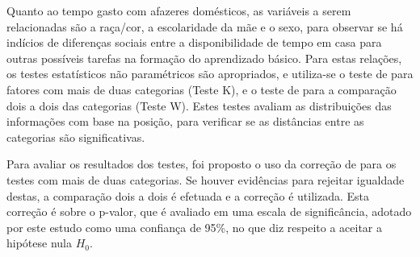 Quanto ao tempo gasto com afazeres domésticos, as variáveis a serem relacionadas são a raça/cor, a escolaridade da mãe
e o sexo, para observar se há indícios de diferenças sociais entre a disponibilidade de tempo em casa para outras possíveis 
tarefas na formação do aprendizado básico. Para estas relações, os testes estatísticos não paramétricos são apropriados,
e utiliza-se o teste de  para fatores com mais de duas categorias (Teste K), e o
teste de  para a comparação dois a dois das categorias (Teste W). Estes testes avaliam as
distribuições das informações com base na posição, para verificar se as distâncias entre as categorias são significativas.

Para avaliar os resultados dos testes, foi proposto o uso da correção de  para os 
testes com mais de duas categorias. Se houver evidências para rejeitar igualdade destas, a comparação dois a dois é
efetuada e a correção é utilizada. Esta correção é sobre o p-valor, que é avaliado em uma escala de significância,
adotado por este estudo como uma confiança de 95\%, no que diz respeito a aceitar a hipótese nula $H_0$.